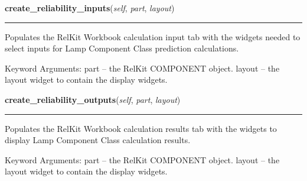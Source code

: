     \label{reliafree:miscellaneous:filter:Filter:create_reliability_inputs}

    \vspace{0.5ex}

\hspace{.8\funcindent}\begin{boxedminipage}{\funcwidth}

    \raggedright \textbf{create\_reliability\_inputs}(\textit{self}, \textit{part}, \textit{layout})

    \vspace{-1.5ex}

    \rule{\textwidth}{0.5\fboxrule}
\setlength{\parskip}{2ex}
    Populates the RelKit Workbook calculation input tab with the widgets
    needed to select inputs for Lamp Component Class prediction 
    calculations.

    Keyword Arguments: part   -- the RelKit COMPONENT object. layout -- 
    the layout widget to contain the display widgets.

\setlength{\parskip}{1ex}
    \end{boxedminipage}

    \label{reliafree:miscellaneous:filter:Filter:create_reliability_outputs}

    \vspace{0.5ex}

\hspace{.8\funcindent}\begin{boxedminipage}{\funcwidth}

    \raggedright \textbf{create\_reliability\_outputs}(\textit{self}, \textit{part}, \textit{layout})

    \vspace{-1.5ex}

    \rule{\textwidth}{0.5\fboxrule}
\setlength{\parskip}{2ex}
    Populates the RelKit Workbook calculation results tab with the 
    widgets to display Lamp Component Class calculation results.

    Keyword Arguments: part   -- the RelKit COMPONENT object. layout -- 
    the layout widget to contain the display widgets.

\setlength{\parskip}{1ex}
    \end{boxedminipage}

